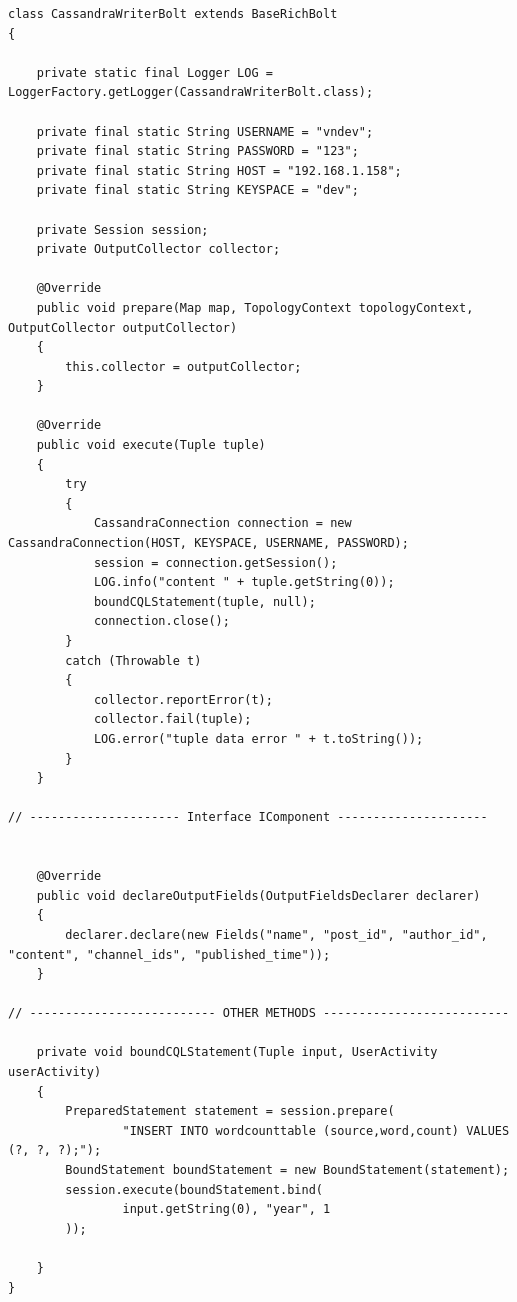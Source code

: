 \documentclass{hcmutarticle}
\begin{document}
\begin{lstlisting}
class CassandraWriterBolt extends BaseRichBolt
{

    private static final Logger LOG = LoggerFactory.getLogger(CassandraWriterBolt.class);

    private final static String USERNAME = "vndev";
    private final static String PASSWORD = "123";
    private final static String HOST = "192.168.1.158";
    private final static String KEYSPACE = "dev";

    private Session session;
    private OutputCollector collector;

    @Override
    public void prepare(Map map, TopologyContext topologyContext, OutputCollector outputCollector)
    {
        this.collector = outputCollector;
    }

    @Override
    public void execute(Tuple tuple)
    {
        try
        {
            CassandraConnection connection = new CassandraConnection(HOST, KEYSPACE, USERNAME, PASSWORD);
            session = connection.getSession();
            LOG.info("content " + tuple.getString(0));
            boundCQLStatement(tuple, null);
            connection.close();
        }
        catch (Throwable t)
        {
            collector.reportError(t);
            collector.fail(tuple);
            LOG.error("tuple data error " + t.toString());
        }
    }

// --------------------- Interface IComponent ---------------------


    @Override
    public void declareOutputFields(OutputFieldsDeclarer declarer)
    {
        declarer.declare(new Fields("name", "post_id", "author_id", "content", "channel_ids", "published_time"));
    }

// -------------------------- OTHER METHODS --------------------------

    private void boundCQLStatement(Tuple input, UserActivity userActivity)
    {
        PreparedStatement statement = session.prepare(
                "INSERT INTO wordcounttable (source,word,count) VALUES (?, ?, ?);");
        BoundStatement boundStatement = new BoundStatement(statement);
        session.execute(boundStatement.bind(
                input.getString(0), "year", 1
        ));

    }
}
\end{lstlisting}
\end{document}
